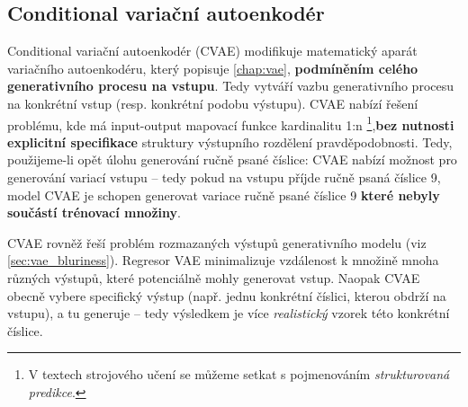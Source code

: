 \subsection{Conditional variační autoenkodér}
Conditional variační autoenkodér (CVAE) \cite{Sohn2015} modifikuje matematický aparát variačního autoenkodéru, který popisuje \autoref{chap:vae}, \textbf{podmíněním celého generativního procesu na vstupu}. Tedy vytváří vazbu generativního procesu na konkrétní vstup (resp. konkrétní podobu výstupu).
CVAE nabízí řešení problému, kde má input-output mapovací funkce kardinalitu 1:n
\footnote{V textech strojového učení se můžeme setkat s pojmenováním \emph{strukturovaná predikce}.},\textbf{bez nutnosti explicitní specifikace} struktury výstupního rozdělení pravděpodobnosti.
Tedy, použijeme-li opět úlohu generování ručně psané číslice: CVAE nabízí možnost pro generování variací vstupu – tedy pokud na vstupu příjde ručně psaná číslice 9, model CVAE je schopen generovat variace ručně psané číslice 9 \textbf{které nebyly součástí trénovací množiny}.

CVAE rovněž řeší problém rozmazaných výstupů generativního modelu (viz \autoref{sec:vae_bluriness}). Regresor VAE minimalizuje vzdálenost k množině mnoha různých výstupů, které potenciálně mohly generovat vstup. Naopak CVAE obecně vybere specifický výstup (např. jednu konkrétní číslici, kterou obdrží na vstupu), a tu generuje – tedy výsledkem je více \emph{realistický} vzorek této konkrétní číslice.  
\cite{Doersch2021}
